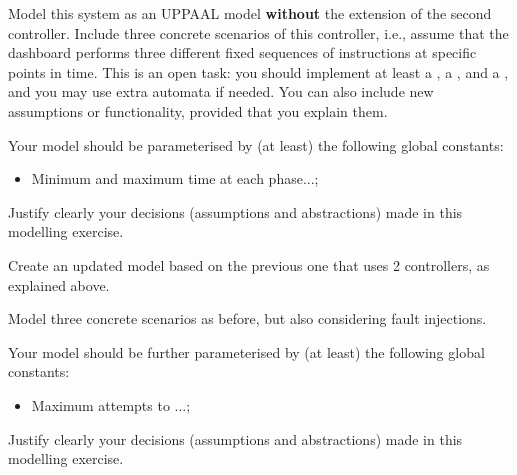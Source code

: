 \documentclass[11pt]{article}
\begin{document}
\begin{myExercise} \label{ex:model}
  Model this system as an UPPAAL model \textbf{without} the extension of the second controller.
  Include three concrete scenarios of this controller, i.e., assume that the dashboard performs three different fixed sequences of instructions at specific points in time.
  This is an open task: you should implement at least a , a , and a , and you may use extra automata if needed. You can also include new assumptions or functionality, provided that you explain them.

  Your model should be parameterised by (at least) the following global constants:
\begin{itemize}
  \item Minimum and maximum time at each phase...;
\end{itemize}
Justify clearly your decisions (assumptions and abstractions) made in this modelling exercise.
\end{myExercise}


\begin{myExercise} \label{ex:model2}
  Create an updated model based on the previous one that uses 2 controllers, as explained above.

  Model three concrete scenarios as before, but also considering fault injections.

  Your model should be further parameterised by (at least) the following global constants:
\begin{itemize}
  \item Maximum attempts to ...;
\end{itemize}
Justify clearly your decisions (assumptions and abstractions) made in this modelling exercise.
\end{myExercise}
\end{document}

